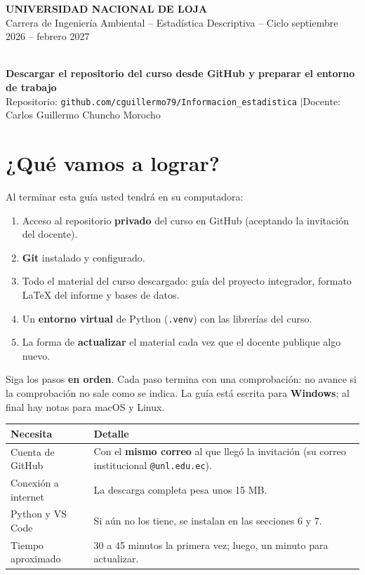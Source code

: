 \documentclass[11pt,a4paper]{article}
\begin{document}
\begin{center}
{\large\bfseries UNIVERSIDAD NACIONAL DE LOJA}\\[2pt]
{\normalsize Carrera de Ingeniería Ambiental -- Estadística Descriptiva -- Ciclo septiembre 2026 -- febrero 2027}
\end{center}
\vspace{-0.3em}
\begin{tcolorbox}[colback=petroleo,colframe=petroleo,arc=1pt,halign=center,top=6pt,bottom=6pt]
\color{white}{\Large\bfseries GUÍA PASO A PASO}\\[3pt]
{\normalsize\bfseries Descargar el repositorio del curso desde GitHub y preparar el entorno de trabajo}\\[3pt]
{\footnotesize Repositorio: \texttt{github.com/cguillermo79/Informacion\_estadistica} \quad$\vert$\quad Docente: Carlos Guillermo Chuncho Morocho}
\end{tcolorbox}

\section{¿Qué vamos a lograr?}

Al terminar esta guía usted tendrá en su computadora:

\begin{enumerate}
  \item Acceso al repositorio \textbf{privado} del curso en GitHub (aceptando la invitación del docente).
  \item \textbf{Git} instalado y configurado.
  \item Todo el material del curso descargado: guía del proyecto integrador, formato \LaTeX{} del informe y bases de datos.
  \item Un \textbf{entorno virtual} de Python (\texttt{.venv}) con las librerías del curso.
  \item La forma de \textbf{actualizar} el material cada vez que el docente publique algo nuevo.
\end{enumerate}

Siga los pasos \textbf{en orden}. Cada paso termina con una comprobación: no avance si la comprobación no sale como se indica. La guía está escrita para \textbf{Windows}; al final hay notas para macOS y Linux.

\begin{center}
\small
\renewcommand{\arraystretch}{1.25}
\begin{tabularx}{\textwidth}{L{3.6cm}Y}
\toprule
\textbf{Necesita} & \textbf{Detalle} \\
\midrule
Cuenta de GitHub & Con el \textbf{mismo correo} al que llegó la invitación (su correo institucional \texttt{@unl.edu.ec}). \\
Conexión a internet & La descarga completa pesa unos 15 MB. \\
Python y VS Code & Si aún no los tiene, se instalan en las secciones 6 y 7. \\
Tiempo aproximado & 30 a 45 minutos la primera vez; luego, un minuto para actualizar. \\
\bottomrule
\end{tabularx}
\end{center}
\end{document}
